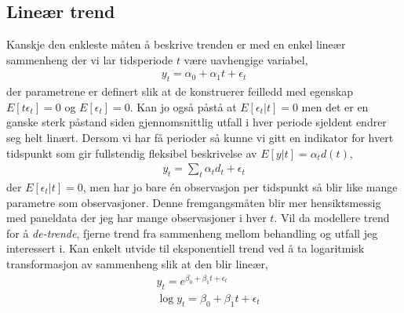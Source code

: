 \subsection{Lineær trend}
Kanskje den enkleste måten å beskrive trenden er med en enkel lineær sammenheng der vi lar tidsperiode $t$ være uavhengige variabel,
\begin{align}
y_t = \alpha_0+\alpha_1 t + \epsilon_t
\end{align}
der parametrene er definert slik at de konstruerer feilledd med egenskap $E[t\epsilon_t]=0$ og $E[\epsilon_t]=0$. Kan jo også påstå at $E[\epsilon_t|t]=0$ men det er en ganske sterk påstand siden gjennomsnittlig utfall i hver periode sjeldent endrer seg helt linært. Dersom vi har få perioder så kunne vi gitt en indikator for hvert tidspunkt som gir fullstendig fleksibel beskrivelse av $E[y|t]=\alpha_t d(t)$,
\begin{align}
y_t = \sum_t \alpha_t d_t + \epsilon_t
\end{align}
der $E[\epsilon_t|t]=0$, men har jo bare én observasjon per tidspunkt så blir like mange parametre som observasjoner. Denne fremgangsmåten blir mer hensiktsmessig med paneldata der jeg har mange observasjoner i hver $t$. Vil da modellere trend for å \textit{de-trende}, fjerne trend fra sammenheng mellom behandling og utfall jeg interessert i. Kan enkelt utvide til eksponentiell trend ved å ta logaritmisk transformasjon av sammenheng slik at den blir lineær,
\begin{align}
&y_t = e^{\beta_0+\beta_1t+\epsilon_t} \\
&\log y_t = \beta_0+\beta_1t+\epsilon_t
\end{align}

